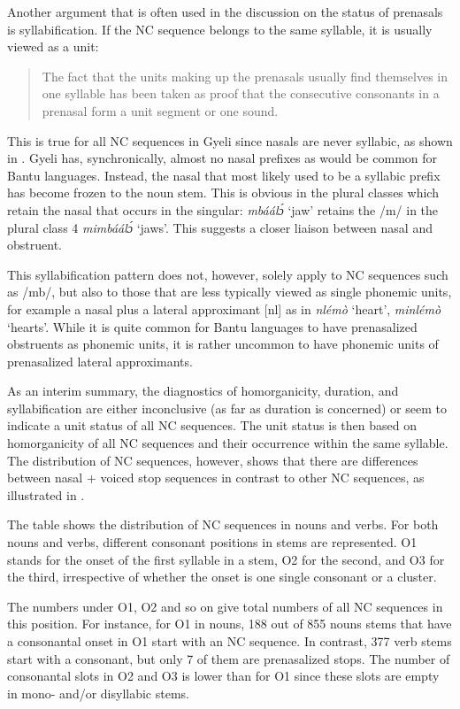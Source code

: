 Another argument that is often used in the discussion on the status of prenasals is syllabification. If the NC sequence belongs to the same syllable, it is usually viewed as a unit: 

\begin{quote} The fact that the units making up the prenasals usually find themselves in one syllable has been taken as proof that the consecutive consonants in a prenasal form a unit segment or one sound.
\citep[62]{ChachaMwita2007}
\end{quote}

This is true for all NC sequences in Gyeli since nasals are never syllabic, as shown in . Gyeli has, synchronically, almost no nasal prefixes as would be common for Bantu languages. Instead, the nasal that most likely used to be a syllabic prefix has become frozen to the noun stem. This is obvious in the plural classes which retain the nasal that occurs in the singular: {\itshape mbáálɔ́} `jaw' retains the /m/ in the plural class 4 {\itshape mimbáálɔ́} `jaws'. This suggests a closer liaison between nasal and obstruent.

This syllabification pattern does not, however, solely apply to NC sequences such as /mb/, but also to those that are less typically viewed as single phonemic units, for example a nasal plus a lateral approximant [nl] as in {\itshape nlémò} `heart', {\itshape minlémò} `hearts'. While it is quite common for Bantu languages to have prenasalized obstruents as phonemic units, it is rather uncommon to have phonemic units of prenasalized lateral approximants. 

As an interim summary, the diagnostics of homorganicity, duration, and syllabification are either inconclusive (as far as duration is concerned) or seem to indicate a unit status of all NC sequences. The unit status is then based on homorganicity of all NC sequences and their occurrence within the same syllable. The distribution of NC sequences, however, shows that there are differences between nasal + voiced stop sequences in contrast to other NC sequences, as illustrated in .


The table shows the distribution of NC sequences in nouns and verbs. For both nouns and verbs, different consonant positions in stems are represented. O1 stands for the onset of the first syllable in a stem, O2 for the second, and O3 for the third, irrespective of whether the onset is one single consonant or a cluster.

The numbers under O1, O2 and so on give total numbers of all NC sequences in this position. For instance, for O1 in nouns, 188 out of 855 nouns stems that have a consonantal onset in O1 start with an NC sequence. In contrast, 377 verb stems start with a consonant, but only 7 of them are prenasalized stops. The number of consonantal slots in O2 and O3 is lower than for O1 since these slots are empty in mono- and/or disyllabic stems.

